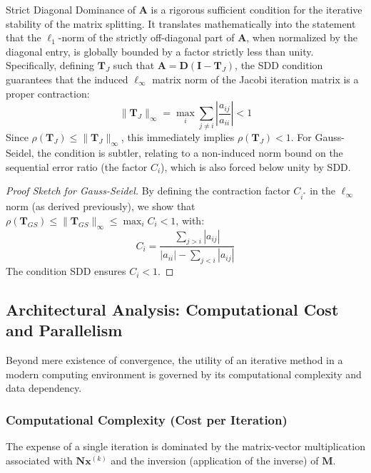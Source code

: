 \begin{remark}
Strict Diagonal Dominance of $\mathbf{A}$ is a rigorous sufficient condition for the iterative stability of the matrix splitting. It translates mathematically into the statement that the $\ell_1$-norm of the strictly off-diagonal part of $\mathbf{A}$, when normalized by the diagonal entry, is globally bounded by a factor strictly less than unity. Specifically, defining $\mathbf{T}_J$ such that $\mathbf{A} = \mathbf{D}(\mathbf{I} - \mathbf{T}_J)$, the SDD condition guarantees that the induced $\ell_{\infty}$ matrix norm of the Jacobi iteration matrix is a proper contraction:
\[ \|\mathbf{T}_J\|_{\infty} = \max_{i} \sum_{j \ne i} \left| \frac{a_{ij}}{a_{ii}} \right| < 1 \]
Since $\rho(\mathbf{T}_J) \le \|\mathbf{T}_J\|_{\infty}$, this immediately implies $\rho(\mathbf{T}_J) < 1$. For Gauss-Seidel, the condition is subtler, relating to a non-induced norm bound on the sequential error ratio (the factor $C_i$), which is also forced below unity by SDD.
\end{remark}

\begin{proof}[Proof Sketch for Gauss-Seidel]
By defining the contraction factor $C_{i^{\ast}}$ in the $\ell_{\infty}$ norm (as derived previously), we show that $\rho(\mathbf{T}_{GS}) \le \|\mathbf{T}_{GS}\|_{\infty} \le \max_i C_i < 1$, with:
\[ C_i = \frac{\sum_{j > i} |a_{ij}|}{|a_{ii}| - \sum_{j < i} |a_{ij}|} \]
The condition SDD ensures $C_i < 1$.
\end{proof}

\subsection{Architectural Analysis: Computational Cost and Parallelism}

Beyond mere existence of convergence, the utility of an iterative method in a modern computing environment is governed by its computational complexity and data dependency.

\subsubsection{Computational Complexity (Cost per Iteration)}

The expense of a single iteration is dominated by the matrix-vector multiplication associated with $\mathbf{N}\mathbf{x}^{(k)}$ and the inversion (application of the inverse) of $\mathbf{M}$.

